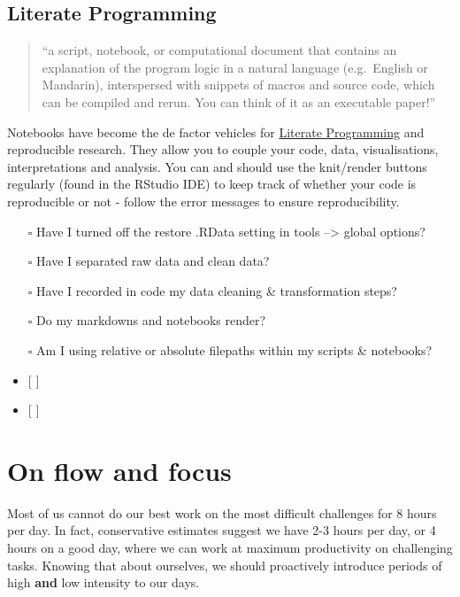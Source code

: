 \documentclass[
  letterpaper,
  DIV=11,
  numbers=noendperiod]{scrreprt}
\providecommand{\tightlist}{%
  \setlength{\itemsep}{0pt}\setlength{\parskip}{0pt}}\usepackage{longtable,booktabs,array}
\begin{document}
\subsection{Literate Programming}\label{literate-programming}

\begin{quote}
``a script, notebook, or computational document that contains an
explanation of the program logic in a natural language (e.g.~English or
Mandarin), interspersed with snippets of macros and source code, which
can be compiled and rerun. You can think of it as an executable paper!''
\end{quote}

Notebooks have become the de factor vehicles for
\href{https://guides.nyu.edu/datascience/literate-prog}{Literate
Programming} and reproducible research. They allow you to couple your
code, data, visualisations, interpretations and analysis. You can and
should use the knit/render buttons regularly (found in the RStudio IDE)
to keep track of whether your code is reproducible or not - follow the
error messages to ensure reproducibility.

\begin{itemize}
\tightlist
\item[$\square$]
  Have I turned off the restore .RData setting in tools --\textgreater{}
  global options?
\item[$\square$]
  Have I separated raw data and clean data?
\item[$\square$]
  Have I recorded in code my data cleaning \& transformation steps?
\item[$\square$]
  Do my markdowns and notebooks render?
\item[$\square$]
  Am I using relative or absolute filepaths within my scripts \&
  notebooks?
\item
  {[} {]}
\item
  {[} {]}
\end{itemize}

\section{On flow and focus}\label{on-flow-and-focus}

Most of us cannot do our best work on the most difficult challenges for
8 hours per day. In fact, conservative estimates suggest we have 2-3
hours per day, or 4 hours on a good day, where we can work at maximum
productivity on challenging tasks. Knowing that about ourselves, we
should proactively introduce periods of high \textbf{and} low intensity
to our days.
\end{document}
